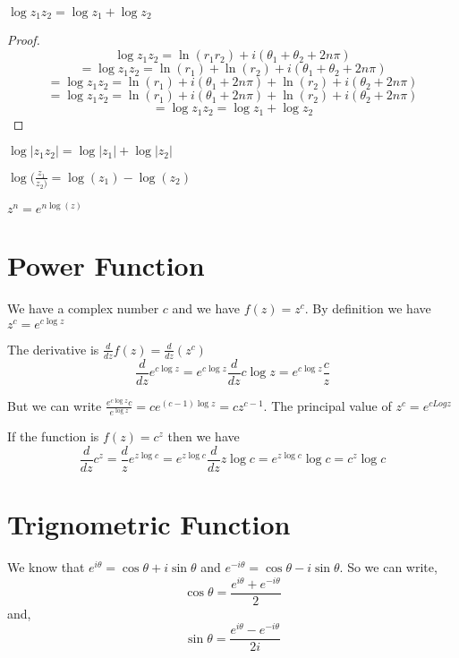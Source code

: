 
\begin{property}
   $\log z_1z_2 = \log z_1 + \log z_2$
\end{property}
\begin{proof}
   
   $$ \log z_1z_2 = \ln(r_1r_2) + i(\theta_1 + \theta_2 + 2n\pi) $$ 
   $$= \log z_1z_2 = \ln(r_1)+ \ln(r_2) + i(\theta_1 + \theta_2 + 2n\pi) $$ 
   $$= \log z_1z_2 = \ln(r_1) + i(\theta_1 + 2n\pi) +  \ln(r_2) + i(\theta_2 + 2n\pi) $$ 
   $$= \log z_1z_2 = \ln(r_1) + i(\theta_1 + 2n\pi) +  \ln(r_2) + i(\theta_2 + 2n\pi) $$ 
   $$= \log z_1z_2 = \log z_1 + \log z_2 $$ 
\end{proof}

\begin{property}
   $\log |z_1z_2| = \log |z_1| + \log |z_2|$
\end{property}
\begin{property}
   $\log (\frac{z_1}{z_2)} = \log (z_1) - \log(z_2)$
\end{property}

\begin{property}
   $z^n = e^{n \log(z)}$
\end{property}

\section{Power Function}
We have a complex number $c$ and we have $f(z) = z^c$. By definition we have $z^c = e^{c\log z}$

The derivative is $\frac{d}{dz} f(z) = \frac{d}{dz} (z^c)$
$$ \frac{d}{dz} e^{c \log z} = e^{c \log z} \frac{d}{dz} c \log z = e^{c\log z}  \frac{c}{z} $$ 


But we can write $ \frac{e^{c \log z} c}{e^{\log z}} = ce^{(c -1)\log z} = cz^{c-1}$. The principal value of $z^{c} = e^{cLog z}$


If the function is $f(z) = c^z$ then we have 
$$ \frac{d}{dz} c^z = \frac{d}{z} e^{z \log c} = e^{z \log c} \frac{d}{dz} z \log c = e^{z \log c} \log c = c^{z}\log c$$ 

\section{Trignometric Function}

We know that $e^{i\theta} = \cos \theta + i \sin \theta$ and $ e^{-i \theta} = \cos \theta - i \sin \theta$. So we can write, 
$$  \cos \theta = \frac{e^{i\theta} + e^{-i \theta}}{2} $$  and, 
$$\sin \theta = \frac{e^{i\theta} - e^{-i \theta}}{2i}$$  

